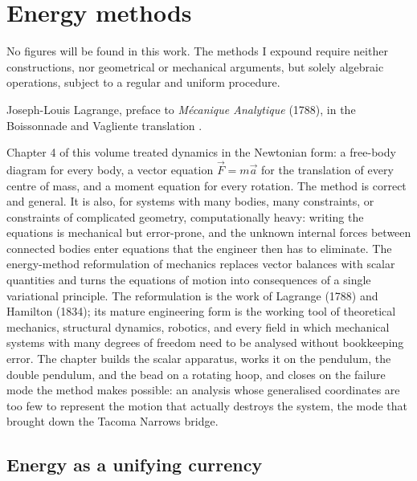 \chapter{Energy methods}
\label{vol03:ch05}

\epigraph{No figures will be found in this work. The methods I expound
require neither constructions, nor geometrical or mechanical
arguments, but solely algebraic operations, subject to a regular and
uniform procedure.}{Joseph-Louis Lagrange, preface to \emph{M\'ecanique
Analytique} (1788), in the Boissonnade and Vagliente translation
\cite[p.~7]{hist:lagrange1788}.}


\noindent
Chapter 4 of this volume treated dynamics in the Newtonian form: a
free-body diagram for every body, a vector equation $\vec{F} = m\vec{a}$
for the translation of every centre of mass, and a moment equation for
every rotation. The method is correct and general. It is also,
for systems with many bodies, many constraints, or constraints of
complicated geometry, computationally heavy: writing the equations is
mechanical but error-prone, and the unknown internal forces between
connected bodies enter equations that the engineer then has to
eliminate. The energy-method reformulation of mechanics replaces vector
balances with scalar quantities and turns the equations of motion into
consequences of a single variational principle. The reformulation is
the work of Lagrange (1788) and Hamilton (1834); its mature engineering
form is the working tool of theoretical mechanics, structural
dynamics, robotics, and every field in which mechanical systems with
many degrees of freedom need to be analysed without bookkeeping
error. The chapter builds the scalar apparatus, works it on the
pendulum, the double pendulum, and the bead on a rotating hoop, and
closes on the failure mode the method makes possible: an analysis whose
generalised coordinates are too few to represent the motion that
actually destroys the system, the mode that brought down the Tacoma
Narrows bridge.

\section{Energy as a unifying currency}

